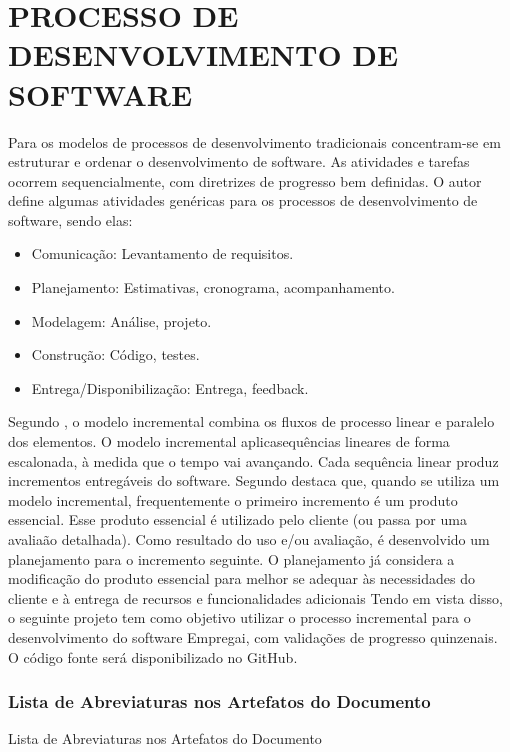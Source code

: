 \chapter{PROCESSO DE DESENVOLVIMENTO DE SOFTWARE}\label{cap:desenvolvimento}
Para \textcite{Pressman2016} os modelos de processos de desenvolvimento 
tradicionais concentram-se em estruturar e ordenar o desenvolvimento de software. As 
atividades e tarefas ocorrem sequencialmente, com diretrizes de progresso bem 
definidas. O autor define algumas atividades genéricas para os processos de 
desenvolvimento de software, sendo elas:
\begin{itemize}[label=$\bullet$]
	\item Comunicação: Levantamento de requisitos.
	\item Planejamento: Estimativas, cronograma, acompanhamento.
	\item Modelagem: Análise, projeto.
	\item Construção: Código, testes.
	\item Entrega/Disponibilização: Entrega, feedback.
	\end{itemize}
	Segundo \textcite{Pressman2016}, o modelo incremental combina os fluxos de processo linear
	e paralelo dos elementos. O modelo incremental aplicasequências lineares de
	forma escalonada, à medida que o tempo vai avançando. Cada sequência linear
	produz incrementos entregáveis do software. \newline
	Segundo \textcite{Pressman2016} destaca que, quando se utiliza um modelo incremental,
	frequentemente o primeiro incremento é um produto essencial. Esse 
	produto essencial é utilizado pelo cliente (ou passa por uma avaliaão detalhada). Como 
	resultado do uso e/ou avaliação, é desenvolvido um planejamento para o incremento
	seguinte. O planejamento já considera a modificação do produto essencial para melhor 
	se adequar às necessidades do cliente e à entrega de recursos e funcionalidades 
	adicionais
	Tendo em vista disso, o seguinte projeto tem como objetivo utilizar o processo 
	incremental para o desenvolvimento do software Empregai, com validações de 
	progresso quinzenais. O código fonte será disponibilizado no GitHub.

\subsection{Lista de Abreviaturas nos Artefatos do Documento}
Lista de Abreviaturas nos Artefatos do Documento

